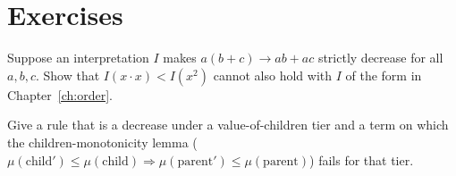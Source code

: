 \section{Exercises}

\begin{exercisebox}
  Suppose an interpretation $I$ makes $a(b+c) \to ab + ac$ strictly decrease for all $a, b, c$.
  Show that $I(x \cdot x) < I(x^2)$ cannot also hold with $I$ of the form in
  Chapter~\ref{ch:order}.
\end{exercisebox}

\begin{exercisebox}
  Give a rule that is a decrease under a value-of-children tier and a term on which the
  children-monotonicity lemma ($\mu(\text{child}') \le \mu(\text{child}) \Rightarrow
  \mu(\text{parent}') \le \mu(\text{parent})$) fails for that tier.
\end{exercisebox}
